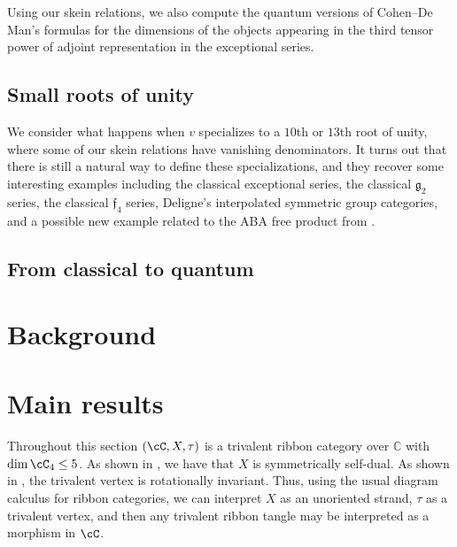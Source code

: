\documentclass[12pt]{amsart}
\begin{document}
Using our skein relations, we also compute the quantum versions of Cohen--De
Man's formulas for the dimensions of the objects appearing in the third tensor
power of adjoint representation in the exceptional series.

\subsection{Small roots of unity}


We consider what happens when $v$ specializes to a $10$th or $13$th
root of unity, where some of our skein relations have vanishing denominators.
It turns out that there is still a natural way to define these
specializations, and they recover some interesting examples including the
classical exceptional series, the classical $\mathfrak{g}_2$ series, the
classical $\mathfrak{f}_4$ series, Deligne's interpolated symmetric group
categories, and a possible new example related to the ABA free product from
\cite{MR3624901}.

\subsection{From classical to quantum}


\section{Background}

\section{Main results}

Throughout this section $(\cC, X, \tau)$ is a trivalent ribbon category over $\mathbb{C}$ with $\dim{\cC_4} \leq 5$.  As shown in \cite[Lemma 2.2]{MR3624901}, we have that $X$ is symmetrically self-dual.  As shown in \cite[Lemma 8.2]{MR3624901}, the trivalent vertex is rotationally invariant.  Thus, using the usual diagram calculus for ribbon categories, we can interpret $X$ as an unoriented strand, $\tau$ as a trivalent vertex, and then any trivalent ribbon tangle may be interpreted as a morphism in $\cC$.
\end{document}
